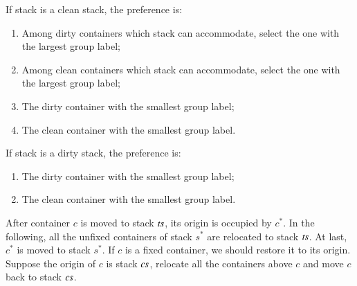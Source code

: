 \documentclass[review,3p,times,authoryear,12pt]{elsarticle}
\begin{document}
If stack  is a clean stack, the preference is:
\begin{enumerate}[1.]
\item Among dirty containers which stack  can accommodate, select the one with the largest group label;
\item Among clean containers which stack  can accommodate, select the one with the largest group label;
\item The dirty container with the smallest group label;
\item The clean container with the smallest group label.
\end{enumerate}

If stack  is a dirty stack, the preference is:
\begin{enumerate}[1.]
\item The dirty container with the smallest group label;
\item The clean container with the smallest group label.
\end{enumerate}
After container $c$ is moved to stack $\id{ts}$, its origin is occupied by $c^*$. In the following, all the unfixed containers of stack $s^*$ are relocated to stack $\id{ts}$. At last, $c^*$ is moved to stack $s^*$. If $c$ is a fixed container, we should restore it to its origin. Suppose the origin of $c$ is stack $\id{cs}$, relocate all the containers above $c$ and move $c$ back to stack $\id{cs}$.
\end{document}
